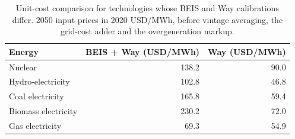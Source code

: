 \begin{table}

\caption{\label{tab:tab_way_unit_cost_compare}Unit-cost comparison for technologies whose BEIS and Way calibrations differ. 2050 input prices in 2020 USD/MWh, before vintage averaging, the grid-cost adder and the overgeneration markup.}
\centering
\begin{tabular}[t]{l|r|r}
\hline
Energy & BEIS + Way (USD/MWh) & Way (USD/MWh)\\
\hline
Nuclear & 138.2 & 90.0\\
\hline
Hydro-electricity & 102.8 & 46.8\\
\hline
Coal electricity & 165.8 & 59.4\\
\hline
Biomass electricity & 230.2 & 72.0\\
\hline
Gas electricity & 69.3 & 54.9\\
\hline
\end{tabular}
\end{table}
